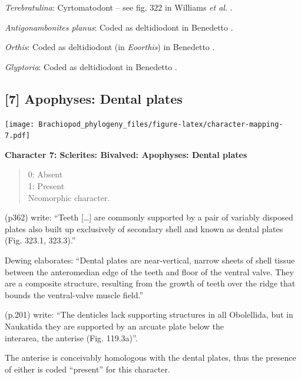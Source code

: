 \documentclass[]{book}
\theoremstyle{definition}
\theoremstyle{definition}
\theoremstyle{definition}
\theoremstyle{remark}
\begin{document}
\emph{Terebratulina}: Cyrtomatodont -- see fig. 322 in Williams \emph{et
al}. \citeyearpar{Williams2000BrachiopodaLinguliformea}.

\emph{Antigonambonites planus}: Coded as deltidiodont in Benedetto
\citeyearpar{Benedetto2009iChaniella}.

\emph{Orthis}: Coded as deltidiodont (in \emph{Eoorthis}) in Benedetto
\citeyearpar{Benedetto2009iChaniella}.

\emph{Glyptoria}: Coded as deltidiodont in Benedetto
\citeyearpar{Benedetto2009iChaniella}.

\hypertarget{apophyses-dental-plates}{%
\subsection*{{[}7{]} Apophyses: Dental
plates}\label{apophyses-dental-plates}}

\texttt{[image: Brachiopod\_phylogeny\_files/figure-latex/character-mapping-7.pdf]}

\textbf{Character 7: Sclerites: Bivalved: Apophyses: Dental plates}

\begin{quote}
0: Absent\\
1: Present\\
Neomorphic character.
\end{quote}

\citet{Williams1997BrachiopodaRevised} (p362) write: ``Teeth
{[}\ldots{}{]} are commonly supported by a pair of variably disposed
plates also built up exclusively of secondary shell and known as dental
plates (Fig. 323.1, 323.3).''

Dewing \citeyearpar{Dewing2001Hingemodifications} elaborates: ``Dental
plates are near-vertical, narrow sheets of shell tissue between the
anteromedian edge of the teeth and floor of the ventral valve. They are
a composite structure, resulting from the growth of teeth over the ridge
that bounds the ventral-valve muscle field.''

\citet{Williams2000BrachiopodaLinguliformea} (p.201) write: ``The
denticles lack supporting structures in all Obolellida, but in Naukatida
they are supported by an arcuate plate below the\\
interarea, the anterise (Fig. 119.3a)''.

The anterise is conceivably homologous with the dental plates, thus the
presence of either is coded ``present'' for this character.
\end{document}
